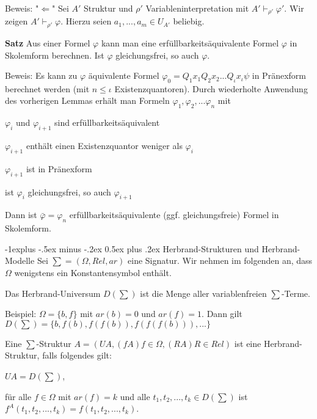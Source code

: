 \documentclass[a4paper]{article}
\makeatletter
\renewcommand{\note}[2]{\begin{noteBox} \textbf{#1} #2 \end{noteBox}}
\renewcommand{\subsection}{\@startsection{subsection}{2}{0mm}%
                {-1explus -.5ex minus -.2ex}%
                {0.5ex plus .2ex}%
                {\normalfont\normalsize\bfseries}}
\makeatother
\begin{document}
\begin{multicols}{3}
  Beweis: "$\Leftarrow$" Sei $A'$ Struktur und $\rho'$ Variableninterpretation mit $A'\vdash_{\rho'}\varphi'$. Wir zeigen $A'\vdash_{\rho'}\varphi$. Hierzu seien $a_1,...,a_m\in U_{A'}$ beliebig.

  \note{Satz}{Aus einer Formel $\varphi$ kann man eine erfüllbarkeitsäquivalente Formel $\varphi$ in Skolemform berechnen. Ist $\varphi$ gleichungsfrei, so auch $\varphi$.}

  Beweis: Es kann zu $\varphi$ äquivalente Formel $\varphi_0 =Q_1 x_1 Q_2 x_2 ...Q_{\iota}  x_{\iota}   \psi$ in Pränexform berechnet werden (mit $n\leq {\iota}  $ Existenzquantoren). Durch wiederholte Anwendung des vorherigen Lemmas erhält man Formeln $\varphi_1,\varphi_2,...\varphi_n$ mit
  \begin{itemize*}
    \item $\varphi_i$ und $\varphi_{i+1}$ sind erfüllbarkeitsäquivalent
    \item $\varphi_{i+1}$ enthält einen Existenzquantor weniger als $\varphi_i$
    \item $\varphi_{i+1}$ ist in Pränexform
    \item ist $\varphi_i$ gleichungsfrei, so auch $\varphi_{i+1}$
  \end{itemize*}

  Dann ist $\bar{\varphi}=\varphi_n$ erfüllbarkeitsäquivalente (ggf. gleichungsfreie) Formel in Skolemform.

  \subsection{Herbrand-Strukturen und Herbrand-Modelle}
  Sei $\sum= (\Omega,Rel,ar)$ eine Signatur. Wir nehmen im folgenden an, dass $\Omega$ wenigstens ein Konstantensymbol enthält.

  Das Herbrand-Universum $D(\sum)$ ist die Menge aller variablenfreien $\sum$-Terme.

  Beispiel: $\Omega =\{b,f\}$ mit $ar(b) =0$ und $ar(f) =1$. Dann gilt $D(\sum) =\{b,f(b),f(f(b)),f(f(f(b))),...\}$

  Eine $\sum$-Struktur $A=(UA,(fA)f\in\Omega,(RA)R\in Rel)$ ist eine Herbrand-Struktur, falls folgendes gilt:
  \begin{enumerate*}
    \item $UA=D(\sum)$,
    \item für alle $f\in\Omega$ mit $ar(f)=k$ und alle $t_1,t_2,...,t_k\in D(\sum)$ ist $f^A(t_1,t_2,...,t_k) =f(t_1,t_2,...,t_k)$.
  \end{enumerate*}


\end{multicols}
\end{document}
